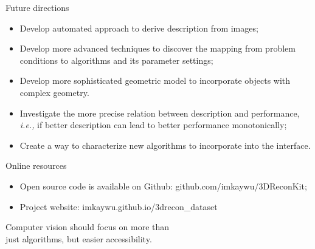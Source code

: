 \documentclass[10pt]{beamer}
\begin{document}
\begin{frame}{Future directions}

\begin{exampleblock}{}

\begin{itemize}
\item Develop automated approach to derive description from images;
\item Develop more advanced techniques to discover the mapping from problem conditions to algorithms and its parameter settings;
\item Develop more sophisticated geometric model to incorporate objects with complex geometry.
\item Investigate the more precise relation between description and performance, \emph{i.e.,} if better description can lead to better performance monotonically;
\item Create a way to characterize new algorithms to incorporate into the interface.
\end{itemize}

\end{exampleblock}

\end{frame}

\begin{frame}{Online resources}

\begin{itemize}
\item Open source code is available on Github: github.com/imkaywu/3DReconKit;
\item Project website: imkaywu.github.io/3drecon\_dataset
\end{itemize}

\end{frame}

\begin{frame}[standout]

Computer vision should focus on more than \\just algorithms, but easier accessibility.

\end{frame}
\end{document}
